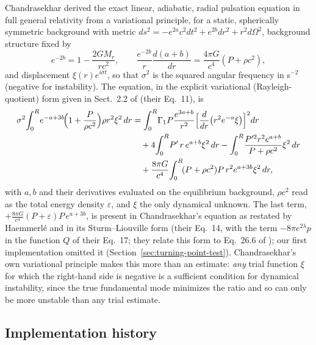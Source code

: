 \documentclass[11pt]{article}
\begin{document}
Chandrasekhar \citep{Chandrasekhar1964GR} derived the exact linear, adiabatic, radial pulsation equation in full general relativity from a variational principle, for a static, spherically symmetric background with metric $ds^2=-e^{2a}c^2dt^2+e^{2b}dr^2+r^2d\Omega^2$, background structure fixed by
\begin{equation}
e^{-2b}=1-\frac{2GM_r}{rc^2},\qquad \frac{e^{-2b}}{r}\frac{d(a+b)}{dr}=\frac{4\pi G}{c^4}(P+\rho c^2),
\end{equation}
and displacement $\xi(r)e^{i\sigma t}$, so that $\sigma^2$ is the squared angular frequency in s$^{-2}$ (negative for instability). The equation, in the explicit variational (Rayleigh-quotient) form given in Sect.~2.2 of \citet{Haemmerle2025} (their Eq.~11), is
\begin{align}
\sigma^2\!\int_0^R\! e^{-a+3b}\!\Big(1+\frac{P}{\rho c^2}\Big)\rho r^2\xi^2\,dr
&=\int_0^R\!\Gamma_1P\frac{e^{3a+b}}{r^2}\Big[\frac{d}{dr}\big(r^2e^{-a}\xi\big)\Big]^2dr\notag\\
&\quad+4\!\int_0^R\! P'\,r\,e^{a+b}\xi^2\,dr-\int_0^R\!\frac{P'^2r^2e^{a+b}}{P+\rho c^2}\xi^2\,dr\\
&\quad+\frac{8\pi G}{c^4}\!\int_0^R\!(P+\rho c^2)P\,r^2e^{a+3b}\xi^2\,dr,
\label{eq:chandra-variational}
\end{align}
with $a,b$ and their derivatives evaluated on the equilibrium background, $\rho c^2$ read as the total energy density $\varepsilon$, and $\xi$ the only dynamical unknown. The last term, $+\frac{8\pi G}{c^4}(P+\varepsilon)P\,e^{a+3b}$, is present in Chandrasekhar's equation as restated by Haemmerl\'e \citep[their Eq.~11]{Haemmerle2025} and in its Sturm--Liouville form \citep{KokkotasRuoff2001} (their Eq.~14, with the term $-8\pi e^{2\lambda}p$ in the function $Q$ of their Eq.~17; they relate this form to Eq.~26.6 of \citealt{MTW1973}); our first implementation omitted it (Section~\ref{sec:turning-point-test}). Chandrasekhar's own variational principle makes this more than an estimate: \emph{any} trial function $\xi$ for which the right-hand side is negative is a sufficient condition for dynamical instability, since the true fundamental mode minimizes the ratio and so can only be more unstable than any trial estimate.

\subsection{Implementation history}
\label{sec:gr-debugging}
\end{document}
